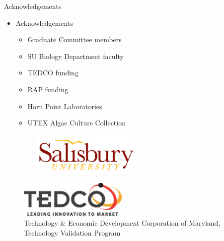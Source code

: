 \documentclass[8pt]{beamer}\usepackage[]{graphicx}\usepackage[]{color}
\begin{document}
\begin{frame}{Acknowledgements}
\begin{itemize}
\item Acknowledgements
  \begin{itemize}
  \item Graduate Committee members
  \item SU Biology Department faculty
  \item TEDCO funding 
  \item RAP funding
  \item Horn Point Laboratories
  \item UTEX Algae Culture Collection
  \end{itemize}
  \begin{figure}
\includegraphics[width=0.5\textwidth]{./figure/bigSU.PNG}
\end{figure}
\end{itemize}
\begin{figure}[hb!]
    \centering
    \includegraphics[scale=0.25]{./figure/tedco_logo_tedco_md}%
    \caption{Technology \& Economic Development Corporation of Maryland, Technology Validation Program}
\end{figure}
% 
% 
\end{frame}
%
% 
\end{document}

